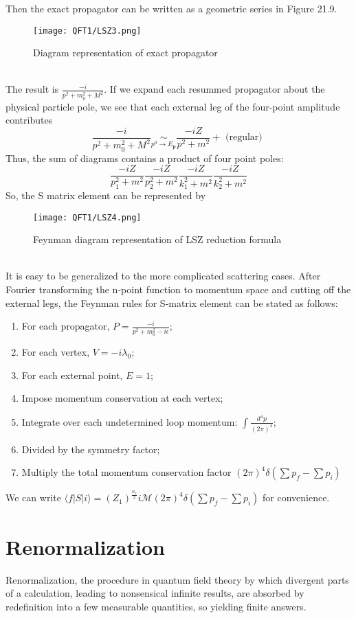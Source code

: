 \documentclass[cyan]{elegantnote}
\begin{document}
\noindent
Then the exact propagator can be written as a geometric series in
Figure 21.9.
\begin{figure}[!h]
\centering
\texttt{[image: QFT1/LSZ3.png]}
\caption{Diagram representation of exact propagator}
\end{figure}\\
The result is $\frac{-i}{p^2 + m_0^2 + M^2}$. If we expand each resummed propagator about the physical particle pole, we see that each external leg of the four-point amplitude contributes
\[\frac{-i}{p^2 + m_0^2 + M^2} \underset{p^0 \to E_{\bm{p}}}{\sim} \frac{-iZ}{p^2+m^2} + \mbox{ (regular) }\]
Thus, the sum of diagrams contains a product of four point poles:
\[\frac{-iZ}{p_1^2 + m^2} \frac{-iZ}{p_2^2 + m^2} \frac{-iZ}{k_1^2 + m^2} \frac{-iZ}{k_2^2 + m^2}\]
So, the S matrix element can be represented by 
\begin{figure}[!h]
\centering
\texttt{[image: QFT1/LSZ4.png]}
\caption{Feynman diagram representation of LSZ reduction formula}
\end{figure}\\
It is easy to be generalized to the more complicated scattering cases. After Fourier transforming the n-point function to momentum space and cutting off the external legs, the Feynman rules for S-matrix element can be stated as follows:
\begin{enumerate}
\item For each propagator, $P = \frac{-i}{p^2 + m_0^2 -i\epsilon}$;
\item For each vertex, $V = -i\lambda_0$;
\item For each external point, $E=1$;
\item Impose momentum conservation at each vertex;
\item Integrate over each undetermined loop momentum: $\int \frac{d^4p}{(2\pi)^4}$;
\item Divided by the symmetry factor;
\item Multiply the total momentum conservation factor $(2\pi)^4 \delta(\sum p_f - \sum p_i)$ 
\end{enumerate}
We can write $\langle f | S | i \rangle = (Z_1)^{\frac{n_s}{2}} i \mathcal{M} (2\pi)^4 \delta(\sum p_f - \sum p_i)$ for convenience.

\section{Renormalization}
\noindent
Renormalization, the procedure in quantum field theory by which divergent parts of a calculation, leading to nonsensical infinite results, are absorbed by redefinition into a few measurable quantities, so yielding finite answers.
\end{document}
